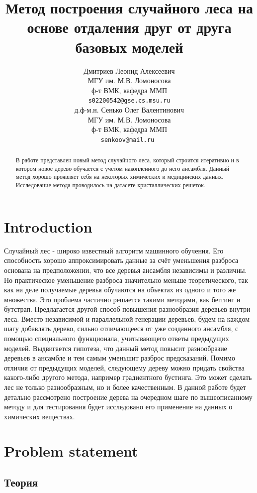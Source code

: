 \documentclass{article}
\title{Метод построения случайного леса на основе отдаления друг от друга базовых моделей}
\author{ Дмитриев Леонид Алексеевич  \\
	МГУ им. М.В. Ломоносова\\
	ф-т ВМК, кафедра ММП\\
	\texttt{s02200542@gse.cs.msu.ru} \\
	\And
	д.ф-м.н. Сенько Олег Валентинович \\
	МГУ им. М.В. Ломоносова\\
	ф-т ВМК, кафедра ММП\\
	\texttt{senkoov@mail.ru } \\
}
\date{}
\begin{document}
\maketitle

\begin{abstract}
	В работе представлен новый метод случайного леса, который строится итеративно и в котором новое дерево обучается с учетом накопленного до него ансамбля. Данный метод хорошо проявляет себя на некоторых химических и медицинских данных. Исследование метода проводилось на датасете кристаллических решеток.
\end{abstract}



\section{Introduction}

Случайный лес - широко известный алгоритм машинного обучения.
Его способность хорошо аппроксимировать данные за счёт
уменьшения разброса основана на предположении, что все деревья
ансамбля независимы и различны. Но практическое уменьшение
разброса значительно меньше теоретического, так как на деле
получаемые деревья обучаются на объектах из одного и того же
множества. Это проблема частично решается такими методами, как
беггинг и бутстрап.
Предлагается другой способ повышения разнообразия деревьев
внутри леса. Вместо независимой и параллельной генерации деревьев,
будем на каждом шагу добавлять дерево, сильно отличающееся от уже
созданного ансамбля, с помощью специального функционала,
учитывающего ответы предыдущих моделей. Выдвигается гипотеза,
что данный метод повысит разнообразие деревьев в ансамбле и тем
самым уменьшит разброс предсказаний.
Помимо отличия от предыдущих моделей, следующему дереву можно
придать свойства какого-либо другого метода, например градиентного
бустинга. Это может сделать лес не только разнообразным, но и более
качественным.
В данной работе будет детально рассмотрено построение дерева на
очередном шаге по вышеописанному методу и для тестирования будет
исследовано его применение на данных о химических веществах.

\section{Problem statement}
\label{sec:headings}

\subsection{Теория}
\end{document}
